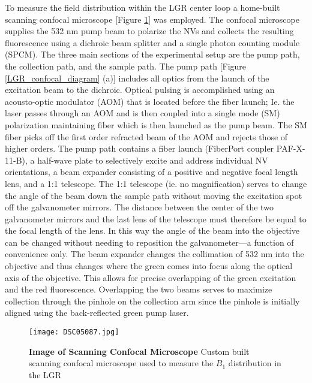 To measure the field distribution within the LGR center loop a home-built scanning confocal microscope [Figure \ref{LGR_confocal_image}] was employed. The confocal microscope supplies the 532 nm pump beam to polarize the NVs and collects the resulting fluorescence using a dichroic beam splitter and a single photon counting module (SPCM). The three main sections of the experimental setup are the pump path, the collection path, and the sample path. The pump path [Figure \ref{LGR_confocal_diagram} (a)] includes all optics from the launch of the excitation beam to the dichroic. Optical pulsing is accomplished using an acousto-optic modulator (AOM) that is located before the fiber launch; Ie. the laser passes through an AOM and is then coupled into a single mode (SM) polarization maintaining fiber which is then launched as the pump beam. The SM fiber picks off the first order refracted beam of the AOM and rejects those of higher orders. The pump path contains a fiber launch (FiberPort coupler PAF-X-11-B), a half-wave plate to selectively excite and address individual NV orientations, a beam expander consisting of a positive and negative focal length lens, and a 1:1 telescope. The 1:1 telescope (ie. no magnification) serves to change the angle of the beam down the sample path without moving the excitation spot off the galvanometer mirrors. The distance between the center of the two galvanometer mirrors and the last lens of the telescope must therefore be equal to the focal length of the lens. In this way the angle of the beam into the objective can be changed without needing to reposition the galvanometer---a function of convenience only. The beam expander changes the collimation of 532 nm into the objective and thus changes where the green comes into focus along the optical axis of the objective. This allows for precise overlapping of the green excitation and the red fluorescence. Overlapping the two beams serves to maximize collection through the pinhole on the collection arm since the pinhole is initially aligned using the back-reflected green pump laser.

\begin{figure}[t!]
\centering
\texttt{[image: DSC05087.jpg]}  
\caption{\textbf{Image of Scanning Confocal Microscope} Custom built scanning confocal microscope used to measure the $B_1$ distribution in the LGR}
\label{LGR_confocal_image}
\end{figure}

